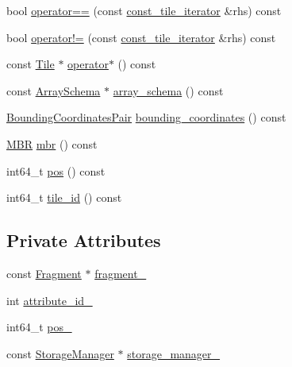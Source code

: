 \begin{DoxyCompactItemize}
\item 
bool \hyperlink{classStorageManager_1_1const__tile__iterator_af0126c053dd95c056662127e2e978ad5}{operator==} (const \hyperlink{classStorageManager_1_1const__tile__iterator}{const\+\_\+tile\+\_\+iterator} \&rhs) const 
\item 
bool \hyperlink{classStorageManager_1_1const__tile__iterator_abe1ae264a1f02e9c32c64a9a0a93c970}{operator!=} (const \hyperlink{classStorageManager_1_1const__tile__iterator}{const\+\_\+tile\+\_\+iterator} \&rhs) const 
\item 
const \hyperlink{classTile}{Tile} $\ast$ \hyperlink{classStorageManager_1_1const__tile__iterator_ae1a97d7a9126049c1691eac222f65610}{operator$\ast$} () const 
\item 
const \hyperlink{classArraySchema}{Array\+Schema} $\ast$ \hyperlink{classStorageManager_1_1const__tile__iterator_a65aa272ec6cd0eaafd9a09bb4a2f1c5e}{array\+\_\+schema} () const 
\item 
\hyperlink{classStorageManager_a2b31e8ccd7a9daa2cf5f9fbf12080667}{Bounding\+Coordinates\+Pair} \hyperlink{classStorageManager_1_1const__tile__iterator_a8e03459d8dfee67912e749015ee2fc3d}{bounding\+\_\+coordinates} () const 
\item 
\hyperlink{classStorageManager_abb895595763203bac1236a1e5886ae91}{M\+B\+R} \hyperlink{classStorageManager_1_1const__tile__iterator_ad052247a7799e918fe860b5c4f5c6af3}{mbr} () const 
\item 
int64\+\_\+t \hyperlink{classStorageManager_1_1const__tile__iterator_a92c60d92b20adf6833f922b47d3ef6a0}{pos} () const 
\item 
int64\+\_\+t \hyperlink{classStorageManager_1_1const__tile__iterator_a386caabe844a1d2faf2889afbb9f81c7}{tile\+\_\+id} () const 
\end{DoxyCompactItemize}
\subsection*{Private Attributes}
\begin{DoxyCompactItemize}
\item 
const \hyperlink{classStorageManager_1_1Fragment}{Fragment} $\ast$ \hyperlink{classStorageManager_1_1const__tile__iterator_ac416f61eeaea36b46e4949bd27644d08}{fragment\+\_\+}
\item 
int \hyperlink{classStorageManager_1_1const__tile__iterator_ab50924c18fb4bbf9e7694d9b0c7eb82b}{attribute\+\_\+id\+\_\+}
\item 
int64\+\_\+t \hyperlink{classStorageManager_1_1const__tile__iterator_aced6cade854a8ca593a55f3e2c35ff79}{pos\+\_\+}
\item 
const \hyperlink{classStorageManager}{Storage\+Manager} $\ast$ \hyperlink{classStorageManager_1_1const__tile__iterator_a79b72bf934834fcbcffbb8b4ceee9b0a}{storage\+\_\+manager\+\_\+}
\end{DoxyCompactItemize}


